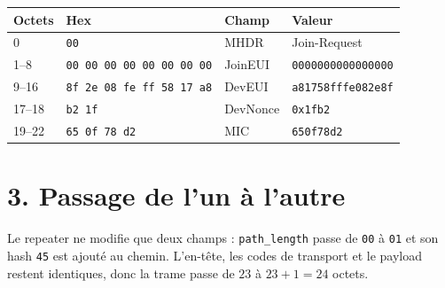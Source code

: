 \documentclass[11pt,a4paper]{article}
\begin{document}
\begin{center}
\begin{tabular}{|l|l|l|l|}
\hline
Octets & Hex & Champ & Valeur \\ \hline
0     & \texttt{00} & MHDR & Join-Request \\ \hline
1--8  & \texttt{00 00 00 00 00 00 00 00} & JoinEUI & \texttt{0000000000000000} \\ \hline
9--16 & \texttt{8f 2e 08 fe ff 58 17 a8} & DevEUI & \texttt{a81758fffe082e8f} \\ \hline
17--18 & \texttt{b2 1f} & DevNonce & \texttt{0x1fb2} \\ \hline
19--22 & \texttt{65 0f 78 d2} & MIC & \texttt{650f78d2} \\ \hline
\end{tabular}
\end{center}

\section*{3. Passage de l'un à l'autre}

Le repeater ne modifie que deux champs : \texttt{path\_length} passe de \texttt{00} à \texttt{01}
et son hash \texttt{45} est ajouté au chemin. L'en-tête, les codes de transport et le payload restent identiques,
donc la trame passe de $23$ à $23 + 1 = 24$ octets.
\end{document}
